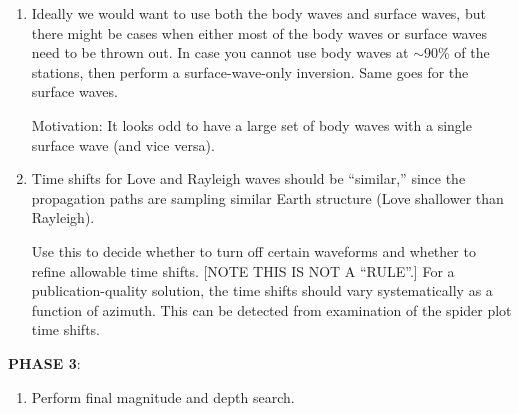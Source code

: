 \begin{enumerate}
\begin{enumerate}

\item Ideally we would want to use both the body waves and surface waves, but there might be cases when either most of the body waves or surface waves need to be thrown out. In case you cannot use body waves at $\sim$90\% of the stations, then perform a surface-wave-only inversion. Same goes for the surface waves.

Motivation: It looks odd to have a large set of body waves with a single surface wave (and vice versa).


\item Time shifts for Love and Rayleigh waves should be ``similar,'' since the propagation paths are sampling similar Earth structure (Love shallower than Rayleigh). 

Use this to decide whether to turn off certain waveforms and whether to refine allowable time shifts. [NOTE THIS IS NOT A ``RULE''.] For a publication-quality solution, the time shifts should vary systematically as a function of azimuth. This can be detected from examination of the spider plot time shifts.
\end{enumerate}

\medskip\noindent
{\bf PHASE 3}:

\begin{enumerate}
\item Perform final magnitude and depth search.


\end{enumerate}


\end{enumerate}

%
%

